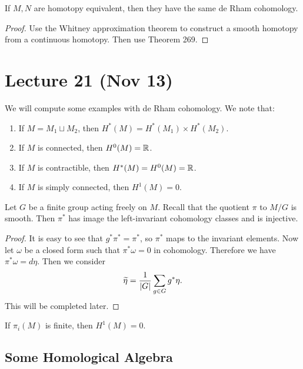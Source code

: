 \documentclass[twoside, 10pt]{article}
\begin{document}
    \begin{cor}
        If $M,N$ are homotopy equivalent, then they have the same de Rham cohomology.
    \end{cor}

    \begin{proof}
        Use the Whitney approximation theorem to construct a smooth homotopy from a continuous homotopy. Then use Theorem 269.
    \end{proof}

    \section{Lecture 21 (Nov 13)}%
    \label{sec:lecture_21_nov_13_}

    We will compute some examples with de Rham cohomology. We note that:
    \begin{enumerate}
        \item If $M = M_1 \sqcup M_2$, then $H^*(M) = H^*(M_1) \times H^*(M_2)$.
        \item If $M$ is connected, then $H^0(M) = \mathbb{R}$.
        \item If $M$ is contractible, then $H^*(M) = H^0(M) = \mathbb{R}$.
        \item If $M$ is simply connected, then $H^1(M) = 0$.
    \end{enumerate}

    \begin{thm}
        Let $G$ be a finite group acting freely on $M$. Recall that the quotient $\pi$ to $M/G$ is smooth. Then $\pi^*$ has image the left-invariant cohomology classes and is injective.
    \end{thm}

    \begin{proof}
        It is easy to see that $g^*\pi^* = \pi^*$, so $\pi^*$ maps to the invariant elements. Now let $\omega$ be a closed form such that $\pi^*\omega = 0$ in cohomology. Therefore we have $\pi^*\omega = d\eta$. Then we consider 
        \[\widetilde{\eta} = \frac{1}{\lvert G\rvert} \sum_{g \in G}g^*\eta. \]
        This will be completed later.
    \end{proof}

    \begin{cor}
        If $\pi_i(M)$ is finite, then $H^1(M) = 0$.
    \end{cor}

    \subsection{Some Homological Algebra}%
    \label{sub:some_homological_algebra}
    
\end{document}
